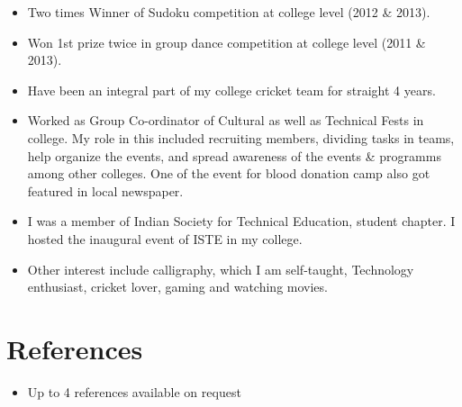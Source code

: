\documentclass[11pt,a4paper,sans]{moderncv}        %
\begin{document}
\begin{itemize}

\item{Two times Winner of Sudoku competition at college level (2012 \& 2013).}

\vspace{6pt}

\item{Won 1st prize twice in group dance competition at college level (2011 \& 2013).}

\vspace{6pt}

\item{Have been an integral part of my college cricket team for straight 4 years.}

\vspace{6pt}

\item{Worked as Group Co-ordinator of Cultural as well as Technical Fests in college. My role in this included recruiting members, dividing tasks in teams, help organize the events, and spread awareness of the events \& programms among other colleges. One of the event for blood donation camp also got featured in local newspaper.}

\vspace{6pt}

\item{I was a member of Indian Society for Technical Education, student chapter. I hosted the inaugural event of ISTE in my college.}

\vspace{6pt}

\item{Other interest include calligraphy, which I am self-taught, Technology enthusiast, cricket lover, gaming and watching movies.}

\end{itemize}

\section{References}

\vspace{6pt}
 
\begin{itemize}

\item{Up to 4 references available on request}

\end{itemize}
\end{document}
